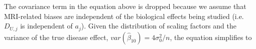 The covariance term in the equation above is dropped because we assume that MRI-related biases are independent of the biological effects being studied (i.e. $D_{U,j}$ is independent of $a_j$). Given the distribution of scaling factors and the variance of the true disease effect, $var(\hat{\beta}_{10}) = 4\sigma_0^2/n$, the equation simplifies to